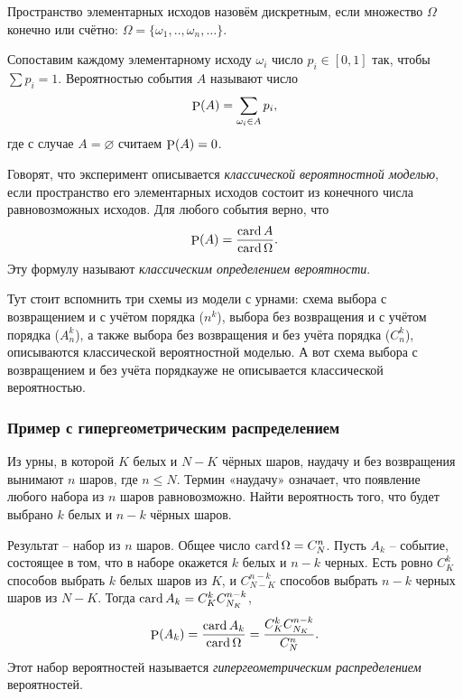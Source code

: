 Пространство элементарных исходов назовём дискретным, если множество $\Omega$ конечно или счётно: $\Omega = \{\omega_1, .., \omega_n, \ldots\}$. 

\begin{to_def}
    Сопоставим каждому элементарному исходу $\omega_i$ число $p_i \in [0, 1]$ так, чтобы $\sum p_i = 1$. Вероятностью события $A$ называют число
    \begin{equation*}
        \P(A) = \sum_{\omega_i \in A} p_i,
    \end{equation*}
    где с случае $A = \varnothing$ считаем $\P(A) = 0$. 
\end{to_def}


\begin{to_def}
    Говорят, что эксперимент описывается \textit{классической вероятностной моделью}, если пространство его элементарных исходов состоит из конечного числа равновозможных исходов. Для любого события верно, что
    \begin{equation}
        \P (A) = \frac{\card A}{\card \Omega}.
    \end{equation}
    Эту формулу называют \textit{классическим определением вероятности}.
\end{to_def}

Тут стоит вспомнить три схемы из модели с урнами: 
схема выбора с возвращением и с учётом порядка ($n^k$), 
выбора без возвращения и с учётом порядка ($A_n^k$), а также выбора
без возвращения и без учёта порядка ($C_n^k$), 
описываются классической вероятностной моделью. 
А вот схема выбора с возвращением и без учёта порядкауже не описывается классической вероятностью. 


\subsubsection*{Пример с гипергеометрическим распределением}
 Из урны, в которой $K$ белых и $N - K$ чёрных шаров, наудачу и без возвращения вынимают $n$ шаров, где $n \leq N$.
Термин «наудачу» означает, что появление любого набора из $n$ шаров равновозможно. Найти вероятность того, что будет выбрано $k$ белых и $n - k$ чёрных шаров.

Результат -- набор из $n$ шаров. Общее число $\card \Omega = C_N^n$. Пусть $A_k$ -- событие, состоящее в том, что в наборе окажется $k$ белых и $n-k$ черных. Есть ровно $C_K^k$ способов выбрать $k$ белых шаров из $K$, и 
$C_{N-K}^{n-k}$ способов выбрать $n-k$ черных шаров из $N-K$. Тогда $\card A_k = C_K^k C_{N_K}^{n-k}$,
\begin{equation*}
    \P (A_k) = \frac{\card A_k}{\card \Omega} = \frac{C_K^k C_{N_K}^{n-k}}{C_N^n}.
\end{equation*}
Этот набор вероятностей называется \textit{гипергеометрическим распределением} вероятностей. 



